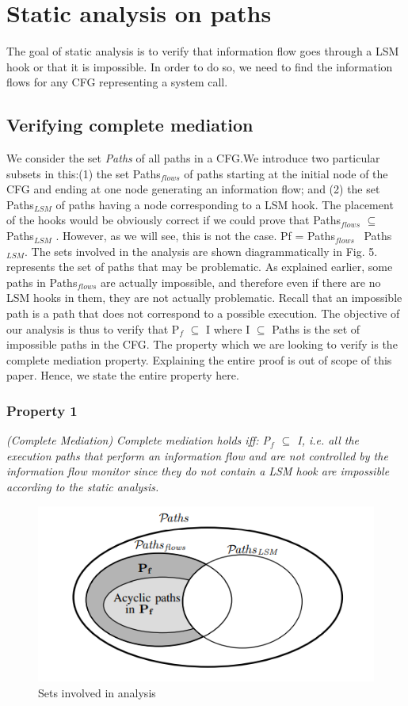 \section{Static analysis on paths}
The goal of static analysis is to verify that information flow goes through a LSM hook or that it is impossible. In order to do so, we need to find the information flows for any CFG representing a system call.

\subsection{Verifying complete mediation}
We consider the set \textit{Paths} of all paths in a CFG.We introduce two particular subsets in this:(1) the set
Paths$_{flows}$  of paths starting at the initial node of the CFG and
ending at one node generating an information flow; and (2) the
set Paths$_{LSM}$  of paths having a node corresponding to a LSM
hook. The placement of the hooks would be obviously correct
if we could prove that Paths$_{flows}$ $\subseteq$ Paths$_{LSM}$ . However, as
we will see, this is not the case. Pf =  Paths$_{flows}$ \ Paths$_{LSM}$. The sets involved in the analysis are shown diagrammatically in Fig. 5.
represents the set of paths that may be problematic.
\vskip 0.1in
As explained earlier, some paths in Paths$_{flows}$  are actually
impossible, and therefore even if there are no LSM hooks
in them, they are not actually problematic. Recall that an
impossible path is a path that does not correspond to a possible
execution. The objective of our analysis is thus to verify that
P$_f$ $\subseteq$ I where I $\subseteq$ Paths is the set of impossible paths in
the CFG.
\vskip 0.1in
The property which we are looking to verify is the complete mediation property. Explaining the entire proof is out of scope of this paper. Hence, we state the entire property here.
\vskip 0.1in
\subsubsection[Property 1 (Complete Mediation)]{Property 1}\textit{(Complete Mediation)}
\vskip 0.2in
\textit{Complete mediation holds iff: P$_f$ $\subseteq$ I, i.e. all the execution
	paths that perform an information flow and are not controlled
	by the information flow monitor since they do not contain a
	LSM hook are impossible according to the static analysis.}
\begin{figure}
	\centering
	\includegraphics[width=0.7\linewidth]{Sets-involved}
	\caption[Sets involved in analysis]{Sets involved in analysis}
	\label{fig:sets-involved}
\end{figure}

